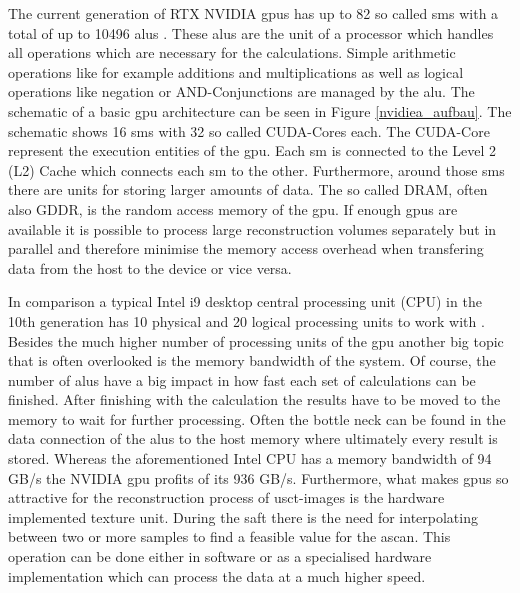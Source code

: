 The current generation of RTX NVIDIA \acp{gpu} has up to 82 so called \acp{sm} with a total of up to 10496 \acp{alu} \cite{gpu_stats}. These \acp{alu} are the unit of a processor which handles all operations which are necessary for the calculations. Simple arithmetic operations like for example additions and multiplications as well as logical operations like negation or AND-Conjunctions are managed by the \ac{alu}. The schematic of a basic \ac{gpu} architecture can be seen in Figure \ref{nvidiea_aufbau}. The schematic shows 16 \acp{sm} with 32 so called CUDA-Cores each. The CUDA-Core represent the execution entities of the \ac{gpu}. Each \ac{sm} is connected to the Level 2 (L2) Cache which connects each \ac{sm} to the other. Furthermore, around those \acp{sm} there are units for storing larger amounts of data. The so called DRAM, often also GDDR, is the random access memory of the \ac{gpu}. If enough \acp{gpu} are available it is possible to process large reconstruction volumes separately but in parallel and therefore minimise the memory access overhead when transfering data from the host to the device or vice versa.


In comparison a typical Intel i9 desktop central processing unit (CPU) in the 10th generation has 10 physical and 20 logical processing units to work with \cite{intel_processor}. Besides the much higher number of processing units of the \ac{gpu} another big topic that is often overlooked is the memory bandwidth of the system. Of course, the number of \acp{alu} have a big impact in how fast each set of calculations can be finished. After finishing with the calculation the results have to be moved to the memory to wait for further processing. Often the bottle neck can be found in the data connection of the \acp{alu} to the host memory where ultimately every result is stored. Whereas the aforementioned Intel CPU has a memory bandwidth of 94 GB/s the NVIDIA \ac{gpu} profits of its 936 GB/s.
Furthermore, what makes \acp{gpu} so attractive for the reconstruction process of \ac{usct}-images is the hardware implemented texture unit. During the \ac{saft} there is the need for interpolating between two or more samples to find a feasible value for the \ac{ascan}. This operation can be done either in software or as a specialised hardware implementation which can process the data at a much higher speed. 


